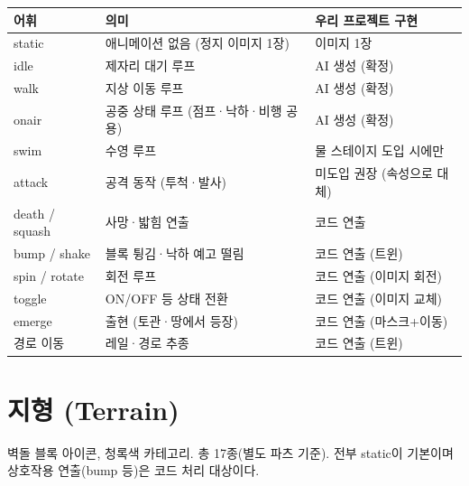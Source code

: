 \documentclass[10pt,a4paper]{article}
\begin{document}
\begin{longtable}{L{2.5cm} L{7cm} L{6cm}}
\toprule
\textbf{어휘} & \textbf{의미} & \textbf{우리 프로젝트 구현} \\
\midrule
static & 애니메이션 없음 (정지 이미지 1장) & 이미지 1장 \\
idle & 제자리 대기 루프 & AI 생성 (확정) \\
walk & 지상 이동 루프 & AI 생성 (확정) \\
onair & 공중 상태 루프 (점프·낙하·비행 공용) & AI 생성 (확정) \\
swim & 수영 루프 & 물 스테이지 도입 시에만 \\
attack & 공격 동작 (투척·발사) & 미도입 권장 (속성으로 대체) \\
death / squash & 사망·밟힘 연출 & 코드 연출 \\
bump / shake & 블록 튕김·낙하 예고 떨림 & 코드 연출 (트윈) \\
spin / rotate & 회전 루프 & 코드 연출 (이미지 회전) \\
toggle & ON/OFF 등 상태 전환 & 코드 연출 (이미지 교체) \\
emerge & 출현 (토관·땅에서 등장) & 코드 연출 (마스크+이동) \\
경로 이동 & 레일·경로 추종 & 코드 연출 (트윈) \\
\bottomrule
\end{longtable}

\newpage
\section{지형 (Terrain)}

벽돌 블록 아이콘, 청록색 카테고리. 총 17종(별도 파츠 기준).
전부 static이 기본이며 상호작용 연출(bump 등)은 코드 처리 대상이다.
\end{document}
